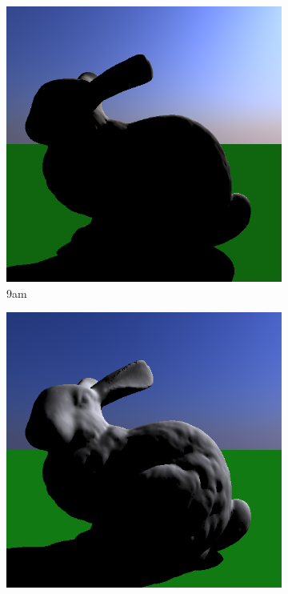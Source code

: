 \documentclass[a4paper]{article}
\begin{document}
\begin{figure}[h]
\begin{subfigure}[b]{0.3\textwidth}
		\includegraphics[width=\textwidth]{week2/2/bunny_9.png}
		\caption{9am}
		\label{fig:skylight9}
	\end{subfigure}
	\begin{subfigure}[b]{0.3\textwidth}
		\includegraphics[width=\textwidth]{week2/2/bunny_11.png}

\end{subfigure}
\end{figure}
\end{document}
